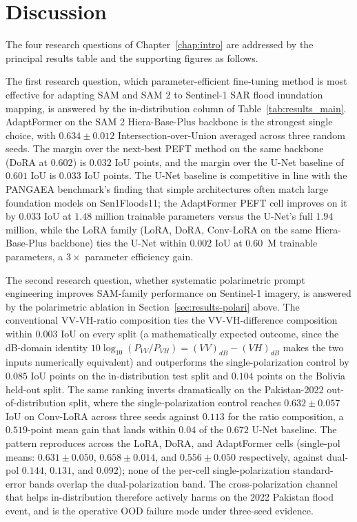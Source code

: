 \documentclass[11pt,a4paper,oneside]{report}
\begin{document}
\section{Discussion}
\label{sec:results-headline-discussion}

The four research questions of Chapter~\ref{chap:intro} are addressed by the principal results table and the supporting figures as follows.

The first research question, which parameter-efficient fine-tuning method is most effective for adapting SAM and SAM 2 to Sentinel-1 SAR flood inundation mapping, is answered by the in-distribution column of Table~\ref{tab:results_main}. AdaptFormer on the SAM 2 Hiera-Base-Plus backbone is the strongest single choice, with $0.634 \pm 0.012$ Intersection-over-Union averaged across three random seeds. The margin over the next-best PEFT method on the same backbone (DoRA at $0.602$) is $0.032$ IoU points, and the margin over the U-Net baseline of $0.601$ IoU is $0.033$ IoU points. The U-Net baseline is competitive in line with the PANGAEA benchmark's finding that simple architectures often match large foundation models on Sen1Floods11; the AdaptFormer PEFT cell improves on it by $0.033$ IoU at $1.48$ million trainable parameters versus the U-Net's full $1.94$ million, while the LoRA family (LoRA, DoRA, Conv-LoRA on the same Hiera-Base-Plus backbone) ties the U-Net within $0.002$ IoU at $0.60$~M trainable parameters, a $3\times$ parameter efficiency gain.

The second research question, whether systematic polarimetric prompt engineering improves SAM-family performance on Sentinel-1 imagery, is answered by the polarimetric ablation in Section~\ref{sec:results-polari} above. The conventional VV-VH-ratio composition ties the VV-VH-difference composition within $0.003$ IoU on every split (a mathematically expected outcome, since the dB-domain identity $10\log_{10}(P_{VV}/P_{VH}) = (VV)_{dB} - (VH)_{dB}$ makes the two inputs numerically equivalent) and outperforms the single-polarization control by $0.085$ IoU points on the in-distribution test split and $0.104$ points on the Bolivia held-out split. The same ranking inverts dramatically on the Pakistan-2022 out-of-distribution split, where the single-polarization control reaches $0.632 \pm 0.057$ IoU on Conv-LoRA across three seeds against $0.113$ for the ratio composition, a $0.519$-point mean gain that lands within $0.04$ of the $0.672$ U-Net baseline. The pattern reproduces across the LoRA, DoRA, and AdaptFormer cells (single-pol means: $0.631 \pm 0.050$, $0.658 \pm 0.014$, and $0.556 \pm 0.050$ respectively, against dual-pol $0.144$, $0.131$, and $0.092$); none of the per-cell single-polarization standard-error bands overlap the dual-polarization band. The cross-polarization channel that helps in-distribution therefore actively harms on the 2022 Pakistan flood event, and is the operative OOD failure mode under three-seed evidence.
\end{document}
